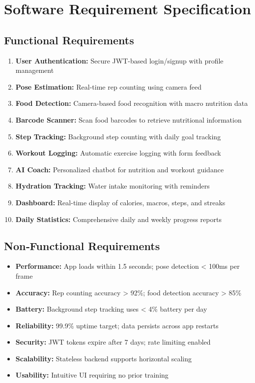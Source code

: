 \documentclass[12pt]{report}
\begin{document}
\chapter{Software Requirement Specification}
\section{Functional Requirements}
\begin{enumerate}
    \item \textbf{User Authentication:} Secure JWT-based login/signup with profile management
    \item \textbf{Pose Estimation:} Real-time rep counting using camera feed
    \item \textbf{Food Detection:} Camera-based food recognition with macro nutrition data
    \item \textbf{Barcode Scanner:} Scan food barcodes to retrieve nutritional information
    \item \textbf{Step Tracking:} Background step counting with daily goal tracking
    \item \textbf{Workout Logging:} Automatic exercise logging with form feedback
    \item \textbf{AI Coach:} Personalized chatbot for nutrition and workout guidance
    \item \textbf{Hydration Tracking:} Water intake monitoring with reminders
    \item \textbf{Dashboard:} Real-time display of calories, macros, steps, and streaks
    \item \textbf{Daily Statistics:} Comprehensive daily and weekly progress reports
\end{enumerate}

\section{Non‑Functional Requirements}
\begin{itemize}
    \item \textbf{Performance:} App loads within 1.5 seconds; pose detection < 100ms per frame
    \item \textbf{Accuracy:} Rep counting accuracy > 92\%; food detection accuracy > 85\%
    \item \textbf{Battery:} Background step tracking uses < 4\% battery per day
    \item \textbf{Reliability:} 99.9\% uptime target; data persists across app restarts
    \item \textbf{Security:} JWT tokens expire after 7 days; rate limiting enabled
    \item \textbf{Scalability:} Stateless backend supports horizontal scaling
    \item \textbf{Usability:} Intuitive UI requiring no prior training
\end{itemize}
\end{document}

